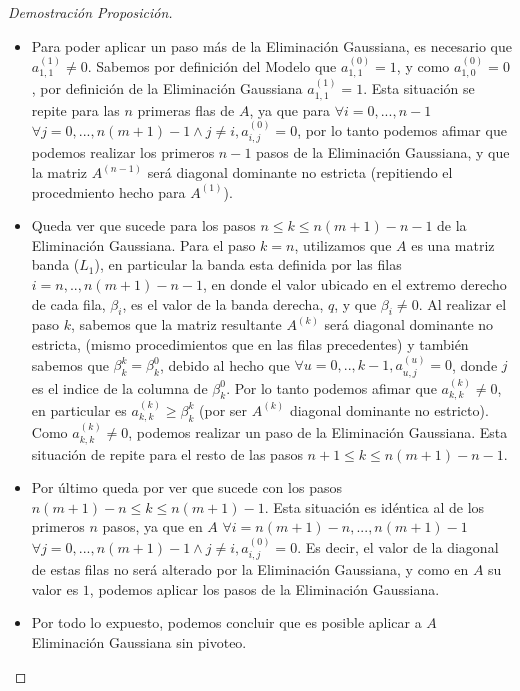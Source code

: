 \begin{proof}[Demostración Proposición]
\begin{itemize}
\item Para poder aplicar un paso más de la Eliminación Gaussiana, es necesario que $a^{(1)}_{1,1} \neq 0$. Sabemos por definición del Modelo que $a^{(0)}_{1,1} = 1$, y como $a^{(0)}_{1,0} = 0$, por definición de la Eliminación Gaussiana $a^{(1)}_{1,1} = 1$. Esta situación se repite para las $n$ primeras flas de $A$, ya que para $\forall i=0,...,n-1$ $\forall j=0,...,n(m+1)-1 \land j \neq i, a^{(0)}_{i,j} = 0$, por lo tanto podemos afimar que podemos realizar los primeros $n-1$ pasos de la Eliminación Gaussiana, y que la matriz $A^{(n-1)}$ será diagonal dominante no estricta (repitiendo el procedmiento hecho para $A^{(1)}$).

\item Queda ver que sucede para los pasos $n \leq k \leq n(m+1)-n-1$ de la Eliminación Gaussiana. Para el paso $k=n$, utilizamos que $A$ es una matriz banda ($L_{1}$), en particular la banda esta definida por las filas $i=n,..,n(m+1)-n-1$, en donde el valor ubicado en el extremo derecho de cada fila, $\beta_{i}$, es el valor de la banda derecha, $q$, y que $\beta_{i} \neq 0$. Al realizar el paso $k$, sabemos que la matriz resultante $A^{(k)}$ será diagonal dominante no estricta, (mismo procedimientos que en las filas precedentes) y también sabemos que $\beta^{k}_{k} = \beta^{0}_{k}$, debido al hecho que $\forall u=0,..,k-1, a^{(u)}_{u,j} = 0$, donde $j$ es el indice de la columna de $\beta^{0}_{k}$. Por lo tanto podemos afimar que $a^{(k)}_{k,k} \neq 0$, en particular es $a^{(k)}_{k,k} \geq \beta^{k}_{k}$ (por ser $A^{(k)}$ diagonal dominante no estricto). Como $a^{(k)}_{k,k} \neq 0$, podemos realizar un paso de la Eliminación Gaussiana. Esta situación de repite para el resto de las pasos $n+1 \leq k \leq n(m+1)-n-1$.

\item Por último queda por ver que sucede con los pasos $ n(m+1)-n \leq k \leq n(m+1)-1$. Esta situación es idéntica al de los primeros $n$ pasos, ya que en $A$  $\forall i=n(m+1)-n,...,n(m+1)-1$ $\forall j=0,...,n(m+1)-1 \land j \neq i, a^{(0)}_{i,j} = 0$. Es decir, el valor de la diagonal de estas filas no será alterado por la Eliminación Gaussiana, y como en $A$ su valor es $1$, podemos aplicar los pasos de la Eliminación Gaussiana.

\item Por todo lo expuesto, podemos concluir que es posible aplicar a $A$ Eliminación Gaussiana sin pivoteo.

\end{itemize}

\end{proof}
